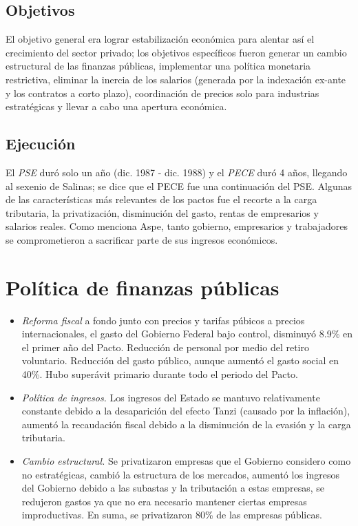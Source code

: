\subsection{Objetivos}
El objetivo general era lograr estabilización económica para alentar así el crecimiento del sector privado; los objetivos específicos fueron generar un cambio estructural de las finanzas públicas, implementar una política monetaria restrictiva, eliminar la inercia de los salarios (generada por la indexación ex-ante y los contratos a corto plazo), coordinación de precios solo para industrias estratégicas y llevar a cabo una apertura económica.

\subsection{Ejecución}
El \textit{PSE} duró solo un año (dic. 1987 - dic. 1988) y el \textit{PECE} duró 4 años, llegando al sexenio de Salinas; se dice que el PECE fue una continuación del PSE. Algunas de las características más relevantes de los pactos fue el recorte a la carga tributaria, la privatización, disminución del gasto, rentas de empresarios y salarios reales. Como menciona Aspe, tanto gobierno, empresarios y trabajadores se comprometieron a sacrificar parte de sus ingresos económicos.

\section{Política de finanzas públicas}
\begin{itemize}%
    \item \textit{Reforma fiscal} a fondo junto con precios y tarifas púbicos a precios internacionales, el gasto del Gobierno Federal bajo control, disminuyó 8.9\% en el primer año del Pacto. Reducción de personal por medio del retiro voluntario. Reducción del gasto público, aunque aumentó el gasto social en 40\%. Hubo superávit primario durante todo el periodo del Pacto.
    \item \textit{Política de ingresos.} Los ingresos del Estado se mantuvo relativamente constante debido a la desaparición del efecto Tanzi (causado por la inflación), aumentó la recaudación fiscal debido a la disminución de la evasión y la carga tributaria.
    \item \textit{Cambio estructural.} Se privatizaron empresas que el Gobierno considero como no estratégicas, cambió la estructura de los mercados, aumentó los ingresos del Gobierno debido a las subastas y la tributación a estas empresas, se redujeron gastos ya que no era necesario mantener ciertas empresas improductivas. En suma, se privatizaron 80\% de las empresas públicas.
\end{itemize}

